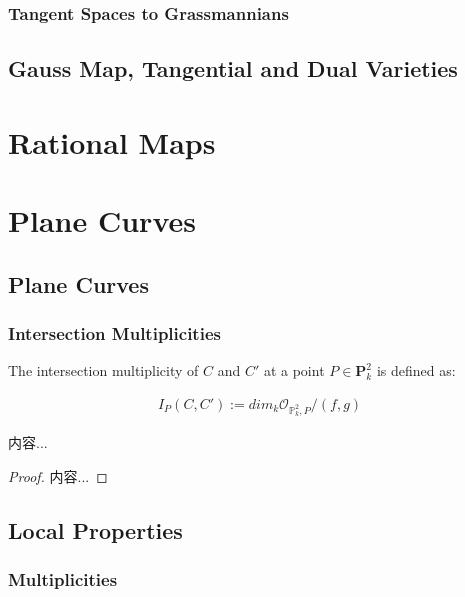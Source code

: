 \documentclass[Total.tex]{subfiles}
\begin{document}
		\subsection{Tangent Spaces to Grassmannians}
		
		
			
		
		\section{Gauss Map, Tangential and Dual Varieties}
		
		
		
	\chapter{Rational Maps}
		
		
			
			
		\chapter{Plane Curves}
			\label{Classical-Algebraic-Geometry-Plane-Curves}
			\section{Plane Curves}
				\subsection{Intersection Multiplicities}
				
					\begin{Def}
						The intersection multiplicity of $C$ and $C'$ at a point $P\in \mathbf{P}^2_k$ is defined as:
						
						\begin{gather*}
							I_P(C,C'):=dim_k \mathcal{O}_{\mathbb{P}^2_k,P}/(f,g)
						\end{gather*}
					\end{Def}
					
					\begin{lemma}
						内容...
					\end{lemma}
					
					\begin{proof}
						内容...
					\end{proof}
			\section{Local Properties}
			
				\subsection{Multiplicities}
			
\end{document}
